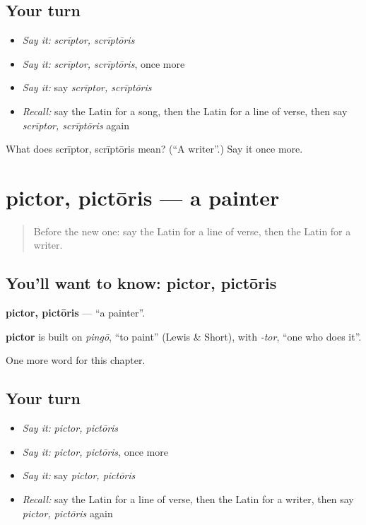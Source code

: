 \subsection*{Your turn}
\begin{itemize}
\raggedright
  \item \emph{Say it:} \emph{scrīptor, scrīptōris}
  \item \emph{Say it:} \emph{scrīptor, scrīptōris}, once more
  \item \emph{Say it:} say \emph{scrīptor, scrīptōris}
  \item \emph{Recall:} say the Latin for a song, then the Latin for a line of verse, then say \emph{scrīptor, scrīptōris} again
\end{itemize}

\begin{tcolorbox}[breakable,colback=teal!4,colframe=teal!35!black,title={Before you move on}]
What does scrīptor, scrīptōris mean? (\textquotedblleft{}A writer\textquotedblright{}.) Say it once more.
\end{tcolorbox}
\section[pictor, pictōris]{pictor, pictōris — a painter}

\label{lesson:LA-C246-pictor}



\begin{quote}
Before the new one: say the Latin for a line of verse, then the Latin for a writer.
\end{quote}

\subsection*{You'll want to know: pictor, pictōris}
\textbf{pictor, pictōris} — \textquotedblleft{}a painter\textquotedblright{}.

\begin{cousinweb}
\textbf{pictor} is built on \emph{pingō}, \textquotedblleft{}to paint\textquotedblright{} (Lewis \& Short), with \emph{-tor}, \textquotedblleft{}one who does it\textquotedblright{}.
\end{cousinweb}

\begin{grammarlens}[title={What you've built}]
One more word for this chapter.
\end{grammarlens}

\subsection*{Your turn}
\begin{itemize}
\raggedright
  \item \emph{Say it:} \emph{pictor, pictōris}
  \item \emph{Say it:} \emph{pictor, pictōris}, once more
  \item \emph{Say it:} say \emph{pictor, pictōris}
  \item \emph{Recall:} say the Latin for a line of verse, then the Latin for a writer, then say \emph{pictor, pictōris} again
\end{itemize}

